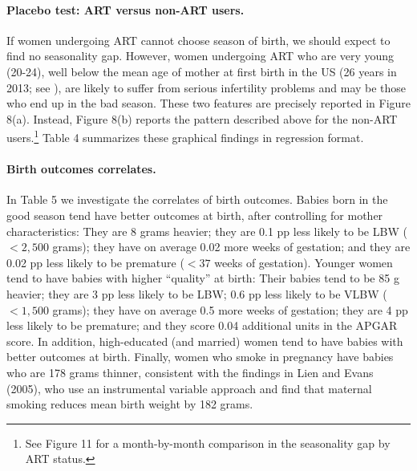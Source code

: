 \documentclass[a4paper, 12 pt]{article}
\theoremstyle{plain}
\begin{document}
\begin{doublespace}
\paragraph{Placebo test: ART versus non-ART users.} If women undergoing ART cannot choose season of birth, we should expect to find no seasonality gap. However, women undergoing ART who are very young (20-24), well below the
 mean age of mother at first birth in the US (26 years in 2013; see \citealp{Martinetal2015}), are likely to suffer from serious infertility problems and may be those who end up in the bad season. These two features are precisely reported in Figure 8(a). Instead, Figure 8(b) reports the pattern described above for the non-ART users.\footnote{See Figure 11 for a month-by-month comparison in the seasonality gap by ART status.} Table 4 summarizes these graphical findings in regression format.

\paragraph{Birth outcomes correlates.} In Table 5 we investigate the correlates of birth outcomes. Babies born in the good season tend have better outcomes at birth, after controlling for mother characteristics: They are 8 grams heavier; they are 0.1 pp less likely to be LBW ($<2,500$ grams); they have on average 0.02 more weeks of gestation; and they are 0.02 pp less likely to be premature ($<37$ weeks of gestation). Younger women tend to have babies with higher ``quality'' at birth: Their babies tend to be 85 g heavier; they are 3 pp less likely to be LBW; 0.6 pp less likely to be VLBW ($<1,500$ grams); they have on average 0.5 more weeks of gestation; they are 4 pp less likely to be premature; and they score 0.04 additional units in the APGAR score. In addition, high-educated (and married) women tend to have babies with better outcomes at birth. Finally, women who smoke in pregnancy have babies who are 178 grams thinner, consistent with the findings in Lien and Evans (2005), who use an instrumental variable approach and find that maternal smoking reduces mean birth weight by 182 grams.



\end{doublespace}
\end{document}
